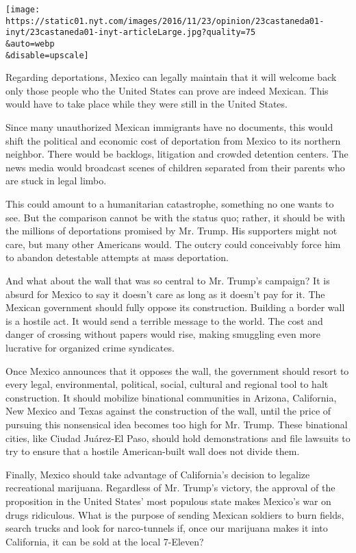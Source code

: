 \texttt{[image: https://static01.nyt.com/images/2016/11/23/opinion/23castaneda01-inyt/23castaneda01-inyt-articleLarge.jpg?quality=75\\\&auto=webp\\\&disable=upscale]}

Regarding deportations, Mexico can legally maintain that it will welcome
back only those people who the United States can prove are indeed
Mexican. This would have to take place while they were still in the
United States.

Since many unauthorized Mexican immigrants have no documents, this would
shift the political and economic cost of deportation from Mexico to its
northern neighbor. There would be backlogs, litigation and crowded
detention centers. The news media would broadcast scenes of children
separated from their parents who are stuck in legal limbo.

This could amount to a humanitarian catastrophe, something no one wants
to see. But the comparison cannot be with the status quo; rather, it
should be with the millions of deportations promised by Mr. Trump. His
supporters might not care, but many other Americans would. The outcry
could conceivably force him to abandon detestable attempts at mass
deportation.

And what about the wall that was so central to Mr. Trump's campaign? It
is absurd for Mexico to say it doesn't care as long as it doesn't pay
for it. The Mexican government should fully oppose its construction.
Building a border wall is a hostile act. It would send a terrible
message to the world. The cost and danger of crossing without papers
would rise, making smuggling even more lucrative for organized crime
syndicates.

Once Mexico announces that it opposes the wall, the government should
resort to every legal, environmental, political, social, cultural and
regional tool to halt construction. It should mobilize binational
communities in Arizona, California, New Mexico and Texas against the
construction of the wall, until the price of pursuing this nonsensical
idea becomes too high for Mr. Trump. These binational cities, like
Ciudad Juárez-El Paso, should hold demonstrations and file lawsuits to
try to ensure that a hostile American-built wall does not divide them.

Finally, Mexico should take advantage of California's decision to
legalize recreational marijuana. Regardless of Mr. Trump's victory, the
approval of the proposition in the United States' most populous state
makes Mexico's war on drugs ridiculous. What is the purpose of sending
Mexican soldiers to burn fields, search trucks and look for
narco-tunnels if, once our marijuana makes it into California, it can be
sold at the local 7-Eleven?

